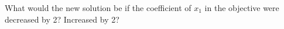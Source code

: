 What would the new solution be if the coefficient of $x_1$ in the objective were decreased by 2? Increased by 2?

\begin{solution}
  \ \\
  \vfill
\end{solution}
